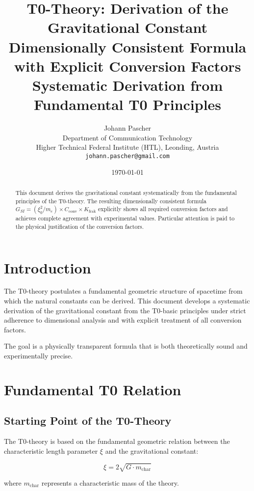 \documentclass[12pt,a4paper]{article}
\title{\textbf{T0-Theory: Derivation of the Gravitational Constant}\\
	\large Dimensionally Consistent Formula with Explicit Conversion Factors\\[0.3cm]
	\normalsize Systematic Derivation from Fundamental T0 Principles}
\author{Johann Pascher\\
	Department of Communication Technology\\
	Higher Technical Federal Institute (HTL), Leonding, Austria\\
	\texttt{johann.pascher@gmail.com}}
\date{\today}
\newcommand{\Kfrak}{K_{\text{frak}}}
\newcommand{\Cconv}{C_{\text{conv}}}
\begin{document}
	
	\maketitle
	
	\begin{abstract}
		This document derives the gravitational constant systematically from the fundamental principles of the T0-theory. The resulting dimensionally consistent formula $G_{SI} = (\xi_0^2/m_e) \times \Cconv \times \Kfrak$ explicitly shows all required conversion factors and achieves complete agreement with experimental values. Particular attention is paid to the physical justification of the conversion factors.
	\end{abstract}
	
	\tableofcontents
	\newpage
	
	\section{Introduction}
	
	The T0-theory postulates a fundamental geometric structure of spacetime from which the natural constants can be derived. This document develops a systematic derivation of the gravitational constant from the T0-basic principles under strict adherence to dimensional analysis and with explicit treatment of all conversion factors.
	
	The goal is a physically transparent formula that is both theoretically sound and experimentally precise.
	
	\section{Fundamental T0 Relation}
	
	\subsection{Starting Point of the T0-Theory}
	
	The T0-theory is based on the fundamental geometric relation between the characteristic length parameter $\xi$ and the gravitational constant:
	
	\begin{equation}
		\xi = 2\sqrt{G \cdot m_{\text{char}}}
		\label{eq:t0_fundamental}
	\end{equation}
	
	where $m_{\text{char}}$ represents a characteristic mass of the theory.
	
\end{document}
